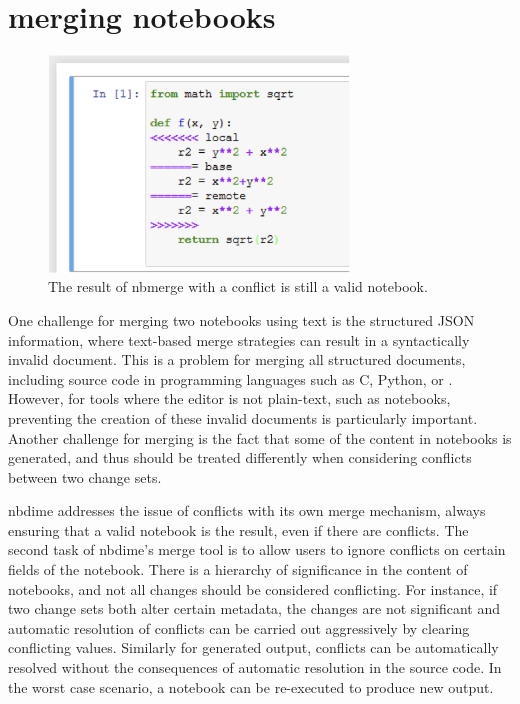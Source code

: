 \documentclass{deliverablereport}
\begin{document}

\section{merging notebooks} %
\label{sec:merging_notebooks}

\begin{figure}
    \center
    \includegraphics[width=8cm]{img/nbmerge}
    \caption{The result of nbmerge with a conflict is still a valid notebook.}
    \label{fig:nbmerge}
\end{figure}

One challenge for merging two notebooks using text is the structured JSON information, where
text-based merge strategies can result in a syntactically invalid document. This is a problem for
merging all structured documents, including source code in programming languages such as C, Python,
or \LaTex. However, for tools where the editor is not plain-text, such as notebooks, preventing the
creation of these invalid documents is particularly important. Another challenge for merging is the
fact that some of the content in notebooks is generated, and thus should be treated differently
when considering conflicts between two change sets.

nbdime addresses the issue of conflicts with its own merge mechanism, always ensuring that a valid notebook is the result, even if there are conflicts.
The second task of nbdime's merge tool is to allow users to ignore conflicts on certain fields of the notebook.
There is a hierarchy of significance in the content of notebooks,
and not all changes should be considered conflicting.
For instance, if two change sets both alter certain metadata,
the changes are not significant and automatic resolution of conflicts
can be carried out aggressively by clearing conflicting values.
Similarly for generated output, conflicts can be automatically resolved without the consequences of automatic resolution in the source code.
In the worst case scenario, a notebook can be re-executed to produce new output.
\end{document}
